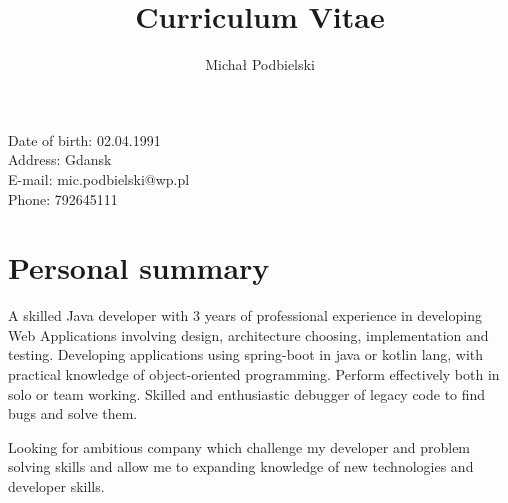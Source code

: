 \documentclass[1pt]{my_cv}
\title{\bfseries Curriculum Vitae}
\author{Michał Podbielski}
\date{}
\begin{document}
	\begin{minipage}{0.65\textwidth}
		\begingroup
		\let\center\flushleft
		\let\endcenter\endflushleft
		\maketitle
		\endgroup
	\end{minipage}
	\begin{minipage}{0.3\textwidth}
	\end{minipage}
	
	\begin{minipage}[ht]{0.48\textwidth}
		\vspace{-1cm}Date of birth: 02.04.1991\\
		Address:  Gdansk\\		
		E-mail:	mic.podbielski@wp.pl\\
		Phone: 792645111\\
	\end{minipage}
	
	\section*{Personal summary}	
		
		\indent A skilled Java developer with 3 years of professional experience in developing Web Applications involving design, architecture choosing, implementation and testing. Developing applications using spring-boot in java or kotlin lang, with practical knowledge of object-oriented programming. Perform effectively both in solo or team working. Skilled and enthusiastic debugger of legacy code to find bugs and solve them.	
		
		Looking for ambitious company which challenge my developer and problem solving skills and allow me to expanding knowledge of new technologies and developer skills.
\end{document}
